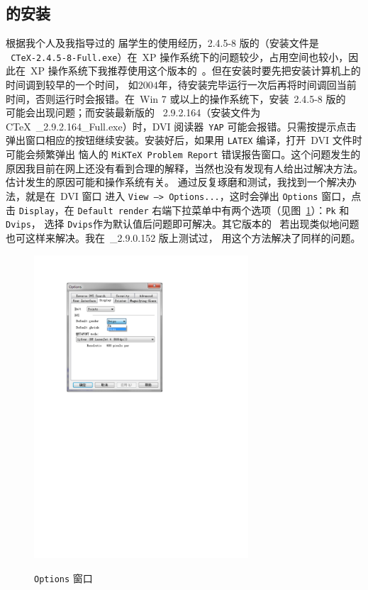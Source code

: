 \subsection{\CTeX{} 的安装}\label{sec:versionSelect}
根据我个人及我指导过的 \nianxian 届学生的使用经历，2.4.5-8 版的\CTeX （安装文件是\\{\tt
CTeX-2.4.5-8-Full.exe}）在~XP 操作系统下的问题较少，占用空间也较小，因此在~XP 操作系统下我推荐使用这个版本的~\CTeX。但在安装时要先把安装计算机上的时间调到较早的一个时间，
如$2004$年，待安装完毕运行一次后再将时间调回当前时间，否则运行时会报错。在~Win 7 或以上的操作系统下，安装~2.4.5-8 版的~\CTeX{} 可能会出现问题；而安装最新版的~
2.9.2.164（安装文件为~
CTeX~\_2.9.2.164\_Full.exe）时，DVI 阅读器~{\tt YAP} 可能会报错。只需按提示点击弹出窗口相应的按钮继续安装。安装好后，如果用{ \tt LATEX} 编译，打开~DVI 文件时可能会频繁弹出
恼人的{ \tt MiKTeX Problem Report} 错误报告窗口。这个问题发生的原因我目前在网上还没有看到合理的解释，当然也没有发现有人给出过解决方法。估计发生的原因可能和操作系统有关。
通过反复琢磨和测试，我找到一个解决办法，就是在~DVI 窗口
进入{ \tt View --> Options...}，这时会弹出{ \tt Options} 窗口，点击{ \tt Display}，在{ \tt Default render} 右端下拉菜单中有两个选项（见图~\ref{fig:optionWin}）：{\tt Pk} 和{ \tt Dvips}，
选择{ \tt Dvips}作为默认值后问题即可解决。其它版本的~\CTeX{} 若出现类似地问题也可这样来解决。我在~\CTeX\_2.9.0.152 版上测试过，
用这个方法解决了同样的问题。
\begin{figure}
\centering
  \includegraphics[width=8cm]{codes/292164wenti}\\
  \caption{{\tt Options} 窗口}\label{fig:optionWin}
\end{figure}
